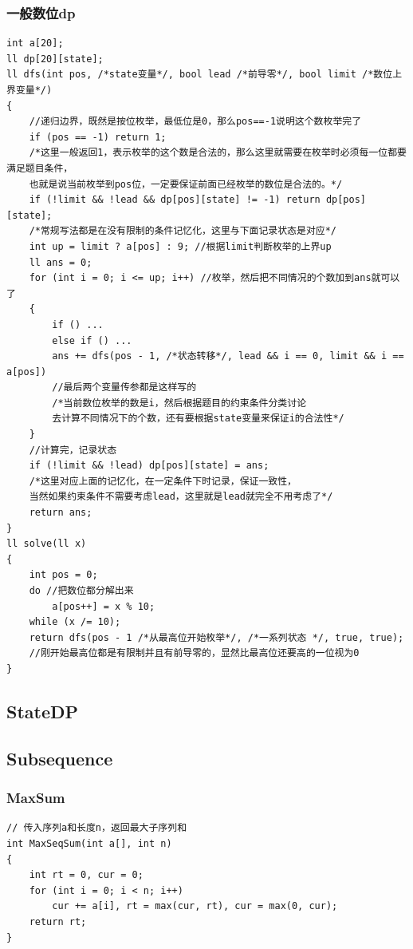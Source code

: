 \documentclass[twoside]{article}
\begin{document}
\subsubsection{一般数位dp}
\begin{lstlisting}
int a[20];
ll dp[20][state];
ll dfs(int pos, /*state变量*/, bool lead /*前导零*/, bool limit /*数位上界变量*/)
{
    //递归边界，既然是按位枚举，最低位是0，那么pos==-1说明这个数枚举完了
    if (pos == -1) return 1;
    /*这里一般返回1，表示枚举的这个数是合法的，那么这里就需要在枚举时必须每一位都要满足题目条件，
    也就是说当前枚举到pos位，一定要保证前面已经枚举的数位是合法的。*/
    if (!limit && !lead && dp[pos][state] != -1) return dp[pos][state];
    /*常规写法都是在没有限制的条件记忆化，这里与下面记录状态是对应*/
    int up = limit ? a[pos] : 9; //根据limit判断枚举的上界up
    ll ans = 0;
    for (int i = 0; i <= up; i++) //枚举，然后把不同情况的个数加到ans就可以了
    {
        if () ...
        else if () ...
        ans += dfs(pos - 1, /*状态转移*/, lead && i == 0, limit && i == a[pos])
        //最后两个变量传参都是这样写的
        /*当前数位枚举的数是i，然后根据题目的约束条件分类讨论
        去计算不同情况下的个数，还有要根据state变量来保证i的合法性*/
    }
    //计算完，记录状态
    if (!limit && !lead) dp[pos][state] = ans;
    /*这里对应上面的记忆化，在一定条件下时记录，保证一致性，
    当然如果约束条件不需要考虑lead，这里就是lead就完全不用考虑了*/
    return ans;
}
ll solve(ll x)
{
    int pos = 0;
    do //把数位都分解出来
        a[pos++] = x % 10;
    while (x /= 10);
    return dfs(pos - 1 /*从最高位开始枚举*/, /*一系列状态 */, true, true);
    //刚开始最高位都是有限制并且有前导零的，显然比最高位还要高的一位视为0
}\end{lstlisting}
\subsection{StateDP}
\subsection{Subsequence}
\subsubsection{MaxSum}
\begin{lstlisting}
// 传入序列a和长度n，返回最大子序列和
int MaxSeqSum(int a[], int n)
{
    int rt = 0, cur = 0;
    for (int i = 0; i < n; i++)
        cur += a[i], rt = max(cur, rt), cur = max(0, cur);
    return rt;
}\end{lstlisting}
\end{document}
